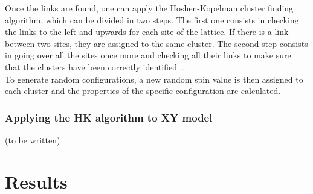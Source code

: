 \documentclass[twoside]{article}
\begin{document}
\begin{multicols}{2}
Once the links are found, one can apply the Hoshen-Kopelman cluster finding algorithm, which can be divided in two steps.
The first one consists in checking the links to the left and upwards for each site of the lattice. If there is a link between two sites, they are assigned to the same cluster. The second step consists in going over all the sites once more and checking all their links to make sure that the clusters have been correctly identified~\cite{joas}. \\ To generate random configurations, a new random spin value is then assigned to each cluster and the properties of the specific configuration are calculated.

\subsubsection{Applying the HK algorithm to XY model}
(to be written)

\section{Results}


\end{multicols}
\end{document}
